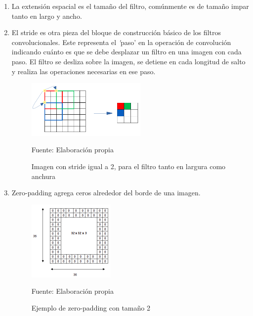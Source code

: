 		\begin{enumerate}
			\item La extensión espacial es el tamaño del filtro, comúnmente es de tamaño impar tanto en largo y ancho.
			
			\item El stride es otra pieza del bloque de construcción básico de los filtros convolucionales. Este representa el {\textit 'paso'} en la operación de convolución indicando cuánto es que se debe desplazar un filtro en una imagen con cada paso. El filtro se desliza sobre la imagen, se detiene en cada longitud de salto y realiza las operaciones necesarias en ese paso.

				\begin{figure}[H]
				\begin{center}
				\includegraphics[width=0.55\textwidth]{images/marcoteorico/stride}
				\end{center}
				\begin{center}
				\caption{\small{Imagen con stride igual a 2, para el filtro tanto en largura como anchura}}
				\vspace{-0.5em}
				{\small{Fuente: Elaboración propia}}
				\end{center}
				\vspace{-1.9em}
				\end{figure}
			\item Zero-padding agrega ceros alrededor del borde de una imagen.
				\begin{figure}[H]
				\begin{center}
				\includegraphics[width=0.4\textwidth]{images/marcoteorico/PAD2}
				\end{center}
				\begin{center}
				\caption{\small{Ejemplo de zero-padding con tamaño 2}}
				\vspace{-0.5em}
				{\small{Fuente: Elaboración propia}}
				\end{center}
				\vspace{-1.9em}
				\end{figure}


\end{enumerate}
